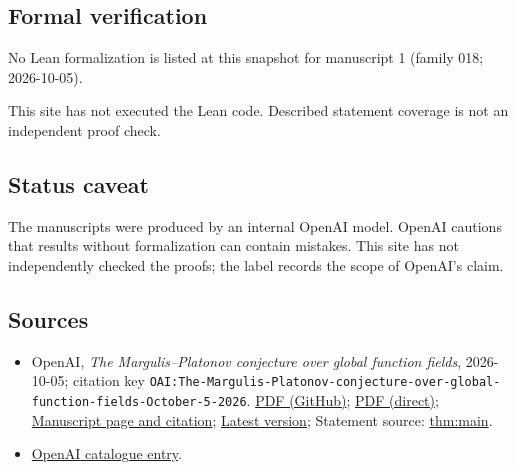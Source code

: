 \documentclass[11pt]{article}
\begin{document}
\subsection{Formal verification}
No Lean formalization is listed at this snapshot for manuscript 1 (family 018; 2026-10-05).

This site has not executed the Lean code. Described statement coverage is not an independent proof check.

\subsection{Status caveat}
The manuscripts were produced by an internal OpenAI model. OpenAI cautions that results without formalization can contain mistakes. This site has not independently checked the proofs; the label records the scope of OpenAI's claim.

\subsection{Sources}
\begin{itemize}
\item OpenAI, \emph{The Margulis–Platonov conjecture over global function fields}, 2026-10-05; citation key \texttt{OAI:The-Margulis-Platonov-conjecture-over-global-function-fields-October-5-2026}. \href{https://github.com/openai/math/blob/adc7f1241b42e322a6451854ab7e4b4c146bf78a/preprints/The-Margulis-Platonov-conjecture-over-global-function-fields-October-5-2026/margulis-platonov-global-function-fields.pdf}{PDF (GitHub)}; \href{https://github.com/openai/math/raw/adc7f1241b42e322a6451854ab7e4b4c146bf78a/preprints/The-Margulis-Platonov-conjecture-over-global-function-fields-October-5-2026/margulis-platonov-global-function-fields.pdf}{PDF (direct)}; \href{https://github.com/openai/math/blob/adc7f1241b42e322a6451854ab7e4b4c146bf78a/preprints/The-Margulis-Platonov-conjecture-over-global-function-fields-October-5-2026/README.md}{Manuscript page and citation}; \href{https://github.com/openai/math/blob/main/preprints/The-Margulis-Platonov-conjecture-over-global-function-fields-October-5-2026/margulis-platonov-global-function-fields.pdf}{Latest version}; Statement source: \href{https://github.com/openai/math/blob/adc7f1241b42e322a6451854ab7e4b4c146bf78a/preprints/The-Margulis-Platonov-conjecture-over-global-function-fields-October-5-2026/build/paper/01-introduction.tex\#L18}{thm:main}.
\item \href{https://github.com/openai/math/blob/adc7f1241b42e322a6451854ab7e4b4c146bf78a/CONTENTS.md}{OpenAI catalogue entry}.
\end{itemize}
\end{document}
